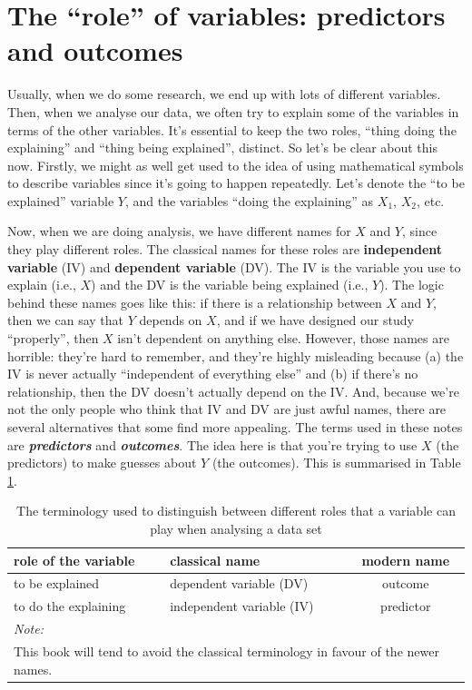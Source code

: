 \documentclass[
  11pt,
]{book}
\theoremstyle{indenteddefinition}
\theoremstyle{indenteddefinition}
\theoremstyle{definition}
\theoremstyle{definition}
\theoremstyle{remark}
\begin{document}
\hypertarget{ivdv}{%
\section{The ``role'' of variables: predictors and outcomes}\label{ivdv}}

Usually, when we do some research, we end up with lots of different variables. Then, when we analyse our data, we often try to explain some of the variables in terms of the other variables. It's essential to keep the two roles, ``thing doing the explaining'' and ``thing being explained'', distinct. So let's be clear about this now. Firstly, we might as well get used to the idea of using mathematical symbols to describe variables since it's going to happen repeatedly. Let's denote the ``to be explained'' variable \(Y\), and the variables ``doing the explaining'' as \(X_1\), \(X_2\), etc.

Now, when we are doing analysis, we have different names for \(X\) and \(Y\), since they play different roles. The classical names for these roles are \textbf{independent variable} (IV) and \textbf{dependent variable} (DV). The IV is the variable you use to explain (i.e., \(X\)) and the DV is the variable being explained (i.e., \(Y\)). The logic behind these names goes like this: if there is a relationship between \(X\) and \(Y\), then we can say that \(Y\) depends on \(X\), and if we have designed our study ``properly'', then \(X\) isn't dependent on anything else. However, those names are horrible: they're hard to remember, and they're highly misleading because (a) the IV is never actually ``independent of everything else'' and (b) if there's no relationship, then the DV doesn't actually depend on the IV. And, because we're not the only people who think that IV and DV are just awful names, there are several alternatives that some find more appealing. The terms used in these notes are \textbf{\emph{predictors}} and \textbf{\emph{outcomes}}. The idea here is that you're trying to use \(X\) (the predictors) to make guesses about \(Y\) (the outcomes). This is summarised in Table \ref{tab:ivdvtable}.

\begin{table}[H]

\caption{\label{tab:ivdvtable}The terminology used to distinguish between 
      different roles that a variable can play when analysing a data set}
\centering
\begin{tabular}[t]{llc}
\toprule
role of the variable & classical name & modern name\\
\midrule
to be explained & dependent variable (DV) & outcome\\
to do the explaining & independent variable (IV) & predictor\\
\bottomrule
\multicolumn{3}{l}{\rule{0pt}{1em}\textit{Note: }}\\
\multicolumn{3}{l}{\rule{0pt}{1em}This book will tend to avoid the classical terminology in favour of the newer names.}\\
\end{tabular}
\end{table}
\end{document}
